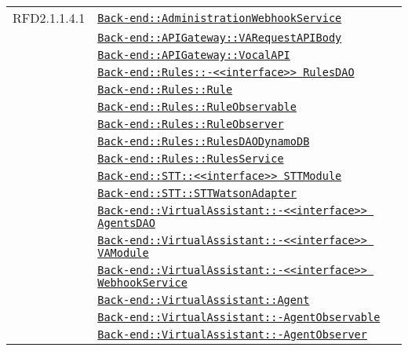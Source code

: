 \begin{longtable}{|>{\centering}m{3cm}|m{10cm}<{\centering}|}
RFD2.1.1.4.1 & \hyperref[Back-end::AdministrationWebhookService]{\texttt{Back-end::AdministrationWebhookService}}\\
& \hyperref[Back-end::APIGateway::VARequestAPIBody]{\texttt{Back-end::APIGateway::VARequestAPIBody}}\\
& \hyperref[Back-end::APIGateway::VocalAPI]{\texttt{Back-end::APIGateway::VocalAPI}}\\
& \hyperref[Back-end::Rules::<<interface>> RulesDAO]{\texttt{Back-end::Rules::-\linebreak <<interface>> RulesDAO}}\\
& \hyperref[Back-end::Rules::Rule]{\texttt{Back-end::Rules::Rule}}\\
& \hyperref[Back-end::Rules::RuleObservable]{\texttt{Back-end::Rules::RuleObservable}}\\
& \hyperref[Back-end::Rules::RuleObserver]{\texttt{Back-end::Rules::RuleObserver}}\\
& \hyperref[Back-end::Rules::RulesDAODynamoDB]{\texttt{Back-end::Rules::RulesDAODynamoDB}}\\
& \hyperref[Back-end::Rules::RulesService]{\texttt{Back-end::Rules::RulesService}}\\
& \hyperref[Back-end::STT::<<interface>> STTModule]{\texttt{Back-end::STT::<<interface>> STTModule}}\\
& \hyperref[Back-end::STT::STTWatsonAdapter]{\texttt{Back-end::STT::STTWatsonAdapter}}\\
& \hyperref[Back-end::VirtualAssistant::<<interface>> AgentsDAO]{\texttt{Back-end::VirtualAssistant::-\linebreak <<interface>> AgentsDAO}}\\
& \hyperref[Back-end::VirtualAssistant::<<interface>> VAModule]{\texttt{Back-end::VirtualAssistant::-\linebreak <<interface>> VAModule}}\\
& \hyperref[Back-end::VirtualAssistant::<<interface>> WebhookService]{\texttt{Back-end::VirtualAssistant::-\linebreak <<interface>> WebhookService}}\\
& \hyperref[Back-end::VirtualAssistant::Agent]{\texttt{Back-end::VirtualAssistant::Agent}}\\
& \hyperref[Back-end::VirtualAssistant::AgentObservable]{\texttt{Back-end::VirtualAssistant::-\linebreak AgentObservable}}\\
& \hyperref[Back-end::VirtualAssistant::AgentObserver]{\texttt{Back-end::VirtualAssistant::-\linebreak AgentObserver}}\\

\end{longtable}
